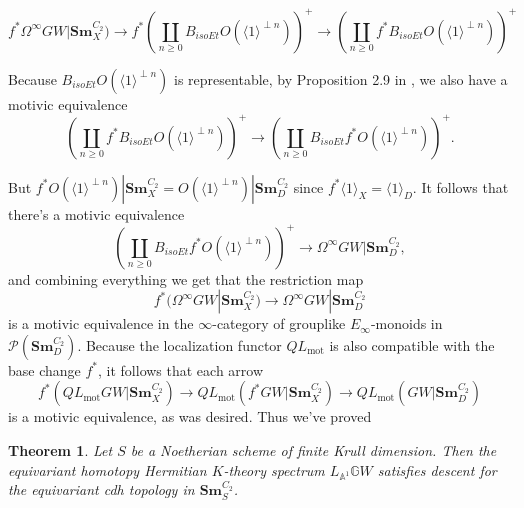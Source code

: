 \documentclass[edeposit,fullpage]{uiucthesis2009}
\newcommand{\mbb}{\mathbb}
\newcommand{\mc}{\mathcal}
\newcommand{\Sm}[1]{\mathbf{Sm}_{#1}}
\theoremstyle{plain}
\numberwithin{lemma}{section}
\newtheorem{theorem}[lemma]{Theorem}
\theoremstyle{definition}
\begin{document}
\[
f^*\Omega^\infty GW|\Sm{X}^{C_2})\rightarrow  f^*\left(\coprod_{n \geq 0} B_{isoEt}O(\langle 1 \rangle^{\perp
    n})\right)^+ \rightarrow \left(\coprod_{n \geq 0} f^*B_{isoEt}O(\langle 1 \rangle^{\perp
    n})\right)^+
\]

Because $B_{isoEt}O(\langle 1 \rangle^{\perp n})$ is representable, by
Proposition 2.9 in \cite{cdhdesc}, we also have a motivic equivalence
\[
\left(\coprod_{n \geq 0} f^*B_{isoEt}O(\langle 1 \rangle^{\perp
    n})\right)^+ \rightarrow \left(\coprod_{n \geq 0} B_{isoEt}f^*O(\langle 1 \rangle^{\perp
    n})\right)^+.
\]

But $f^*O(\langle 1 \rangle^{\perp n})|\Sm{X}^{C_2} = O(\langle 1
\rangle^{\perp n})|\Sm{D}^{C_2}$ since $f^*\langle 1 \rangle_X =
\langle 1 \rangle_D$. It follows that there's a motivic equivalence 
\[
 \left(\coprod_{n \geq 0} B_{isoEt}f^*O(\langle 1 \rangle^{\perp
    n})\right)^+ \rightarrow \Omega^\infty GW|\Sm{D}^{C_2},
\]
and combining everything we get that the restriction map
\[
f^*(\Omega^\infty GW|\Sm{X}^{C_2}) \rightarrow \Omega^\infty GW|\Sm{D}^{C_2}
\]
is a motivic equivalence in the $\infty$-category of grouplike
$E_\infty$-monoids in $\mc P(\Sm{D}^{C_2})$. Because the localization
functor $QL_{\mathrm{mot}}$ is also compatible with the base change
$f^*$, it follows that each arrow 
\[
f^*(QL_{\mathrm{mot}}GW|\Sm{X}^{C_2}) \rightarrow
QL_{\mathrm{mot}}(f^*GW|\Sm{X}^{C_2}) \rightarrow QL_{\mathrm{mot}}(GW|\Sm{D}^{C_2})
\]
is a motivic equivalence, as was desired. Thus we've proved

\begin{theorem}\label{thm:cdh_desc}
Let $S$ be a Noetherian scheme of finite Krull dimension. Then the
equivariant homotopy Hermitian $K$-theory spectrum $L_{\mbb A^1}\mbb
GW$ satisfies descent for the equivariant cdh topology in $\Sm{S}^{C_2}$.
\end{theorem}



\end{document}
